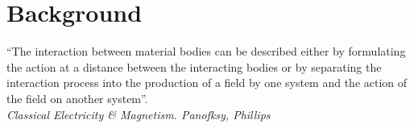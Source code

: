 \chapter{Background}
\begin{center}
  \begin{minipage}{0.75\textwidth}
    \begin{small}
      “The interaction between material bodies can be described either by formulating the action at a distance between the interacting bodies or by separating the interaction process into the production of a field by one system and the action of the field on another system”. \\
      \null\hfill\emph{Classical Electricity \& Magnetism. Panofksy, Phillips}
    \end{small}
  \end{minipage}
  \vspace{0.5cm}
\end{center}






